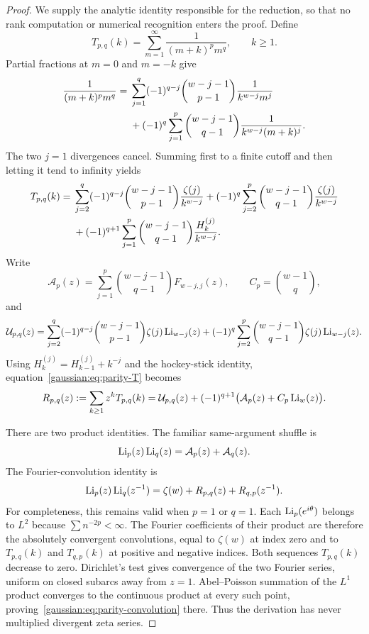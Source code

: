 \begin{proof}
We supply the analytic identity responsible for the reduction, so that no
rank computation or numerical recognition enters the proof. Define
\[
 T_{p,q}(k)=\sum_{m=1}^{\infty}\frac1{(m+k)^p m^q},\qquad k\ge1.
\]
Partial fractions at $m=0$ and $m=-k$ give
\begin{align}
 \frac1{(m+k)^p m^q}
 ={}&\sum_{j=1}^{q}(-1)^{q-j}
       \binom{w-j-1}{p-1}\frac1{k^{w-j}m^j}\notag\\
 &+(-1)^q\sum_{j=1}^{p}
       \binom{w-j-1}{q-1}\frac1{k^{w-j}(m+k)^j}.
 \label{gaussian:eq:parity-pf}
\end{align}
The two $j=1$ divergences cancel. Summing first to a finite cutoff and
then letting it tend to infinity yields
\begin{align}
 T_{p,q}(k)={}&
 \sum_{j=2}^{q}(-1)^{q-j}\binom{w-j-1}{p-1}
                \frac{\zeta(j)}{k^{w-j}}
 +(-1)^q\sum_{j=2}^{p}\binom{w-j-1}{q-1}
                \frac{\zeta(j)}{k^{w-j}}\notag\\
 &+(-1)^{q+1}\sum_{j=1}^{p}\binom{w-j-1}{q-1}
                \frac{H_k^{(j)}}{k^{w-j}}.
 \label{gaussian:eq:parity-T}
\end{align}
Write
\[
 \mathcal A_p(z)=\sum_{j=1}^{p}\binom{w-j-1}{q-1}F_{w-j,j}(z),
 \qquad C_p=\binom{w-1}{q},
\]
and
\[
 \mathcal U_{p,q}(z)=
 \sum_{j=2}^{q}(-1)^{q-j}\binom{w-j-1}{p-1}
                 \zeta(j)\operatorname{Li}_{w-j}(z)
 +(-1)^q\sum_{j=2}^{p}\binom{w-j-1}{q-1}
                 \zeta(j)\operatorname{Li}_{w-j}(z).
\]
Using $H_k^{(j)}=H_{k-1}^{(j)}+k^{-j}$ and the hockey-stick identity,
equation~\eqref{gaussian:eq:parity-T} becomes
\begin{equation}\label{gaussian:eq:parity-R}
 R_{p,q}(z):=\sum_{k\ge1}z^kT_{p,q}(k)
 =\mathcal U_{p,q}(z)+(-1)^{q+1}
        \bigl(\mathcal A_p(z)+C_p\operatorname{Li}_w(z)\bigr).
\end{equation}

There are two product identities. The familiar same-argument shuffle is
\begin{equation}\label{gaussian:eq:parity-shuffle}
 \operatorname{Li}_p(z)\operatorname{Li}_q(z)=\mathcal A_p(z)+\mathcal A_q(z).
\end{equation}
The Fourier-convolution identity is
\begin{equation}\label{gaussian:eq:parity-convolution}
 \operatorname{Li}_p(z)\operatorname{Li}_q(z^{-1})
       =\zeta(w)+R_{p,q}(z)+R_{q,p}(z^{-1}).
\end{equation}
For completeness, this remains valid when $p=1$ or $q=1$. Each
$\operatorname{Li}_p(e^{i\theta})$ belongs to $L^2$ because $\sum n^{-2p}<\infty$.
The Fourier coefficients of their product are therefore the absolutely
convergent convolutions, equal to $\zeta(w)$ at index zero and to
$T_{p,q}(k)$ and $T_{q,p}(k)$ at positive and negative indices. Both
sequences $T_{p,q}(k)$ decrease to zero. Dirichlet's test gives convergence
of the two Fourier series, uniform on closed subarcs away from $z=1$.
Abel--Poisson summation of the $L^1$ product converges to the continuous
product at every such point, proving~\eqref{gaussian:eq:parity-convolution} there.
Thus the derivation has never multiplied divergent zeta series.


\end{proof}
